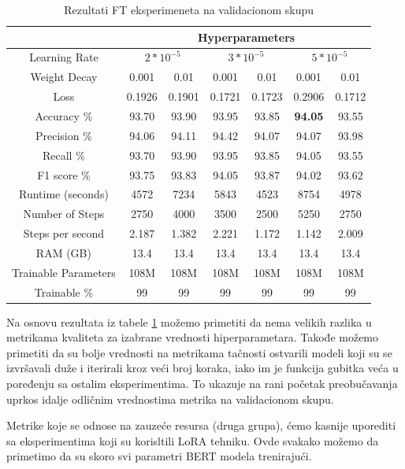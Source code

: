 \documentclass{article}
\theoremstyle{definition}
\begin{document}
	\begin{table}
		\centering
		\begin{tabular}{| c || c | c | c | c | c | c |} 
			\hline
			& \multicolumn{6}{c|}{Hyperparameters} \\
			\hline
			Learning Rate & \multicolumn{2}{c|}{$2*10^{-5}$} & 
			\multicolumn{2}{c|}{$3*10^{-5}$} & \multicolumn{2}{c|}{$5*10^{-5}$} \\
			\hline
			Weight Decay & 0.001 & 0.01 & 0.001 & 0.01 & 0.001 & 0.01 \\ [0.5ex]
			\hline\hline
			Loss & 0.1926 & 0.1901 & 0.1721 & 0.1723 & 0.2906 & 0.1712 \\
			Accuracy \% & 93.70 & 93.90 & 93.95 & 93.85 & \textbf{94.05} 
			\tablefootnote{Ovaj trening će se u tabeli test rezultata zvati FT} & 93.55 \\
			Precision \% & 94.06 & 94.11 & 94.42 & 94.07 & 94.07 & 93.98 \\
			Recall \% & 93.70 & 93.90 & 93.95 & 93.85 & 94.05 & 93.55 \\
			F1 score  \% & 93.75 & 93.83 & 94.05 & 93.87 & 94.02 & 93.62 \\
			\hline
			Runtime (seconds) & 4572 & 7234 & 5843 & 4523 & 8754 & 4978 \\
			Number of Steps & 2750 & 4000 & 3500 & 2500 & 5250 & 2750\\
			Steps per second & 2.187 & 1.382 & 2.221 & 1.172 & 1.142 & 2.009 \\
			RAM (GB) & 13.4 & 13.4 & 13.4 & 13.4 & 13.4 & 13.4 \\
			Trainable Parameters & 108M & 108M & 108M & 108M & 108M & 108M \\
			Trainable \% & 99 & 99 & 99 & 99 & 99 & 99 \\
			\hline
		\end{tabular}
		\caption{\label{ft-table} Rezultati FT eksperimeneta na validacionom skupu}
	\end{table}

	Na osnovu rezultata iz tabele \ref{ft-table} možemo primetiti da nema velikih razlika u 
	metrikama kvaliteta za izabrane vrednosti hiperparametara. Takođe možemo
	primetiti da su bolje vrednosti na metrikama tačnosti ostvarili modeli koji
	su se izvršavali duže i iterirali kroz veći broj koraka, iako im je funkcija
	gubitka veća u poređenju sa ostalim eksperimentima. To ukazuje na rani početak 
	preobučavanja uprkos idalje odličnim vrednostima metrika na validacionom skupu.

	Metrike koje se odnose na zauzeće resursa (druga grupa), ćemo kasnije uporediti
	sa eksperimentima koji su korisltili LoRA tehniku. Ovde svakako možemo da 
	primetimo da su skoro svi parametri BERT modela trenirajući.
\end{document}
